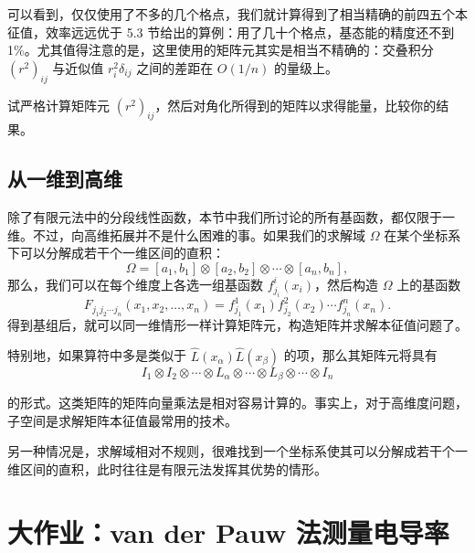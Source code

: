 可以看到，仅仅使用了不多的几个格点，我们就计算得到了相当精确的前四五个本征值，效率远远优于 5.3 节给出的算例：用了几十个格点，基态能的精度还不到 1\%。尤其值得注意的是，这里使用的矩阵元其实是相当不精确的：交叠积分 $(r^2)_{ij}$ 与近似值 $r_i^2\delta_{ij}$ 之间的差距在 $O(1/n)$ 的量级上。

\begin{exerciseBox}[练习 5.3]
试严格计算矩阵元 $(r^2)_{ij}$，然后对角化所得到的矩阵以求得能量，比较你的结果。
\end{exerciseBox}

\subsection{从一维到高维}

除了有限元法中的分段线性函数，本节中我们所讨论的所有基函数，都仅限于一维。不过，向高维拓展并不是什么困难的事。如果我们的求解域 $\Omega$ 在某个坐标系下可以分解成若干个一维区间的直积：
\begin{equation}
\Omega=[a_1,b_1]\otimes[a_2,b_2]\otimes\cdots\otimes[a_n,b_n],
\tag{5.4.53}
\end{equation}
那么，我们可以在每个维度上各选一组基函数 $f_{j_i}^{i}(x_i)$，然后构造 $\Omega$ 上的基函数
\begin{equation}
F_{j_1j_2\cdots j_n}(x_1,x_2,\ldots,x_n)=f_{j_1}^{1}(x_1)f_{j_2}^{2}(x_2)\cdots f_{j_n}^{n}(x_n).
\tag{5.4.54}
\end{equation}
得到基组后，就可以同一维情形一样计算矩阵元，构造矩阵并求解本征值问题了。

特别地，如果算符中多是类似于 $\hat L(x_\alpha)\hat L(x_\beta)$ 的项，那么其矩阵元将具有
\begin{equation}
I_1\otimes I_2\otimes\cdots\otimes L_\alpha\otimes\cdots\otimes L_\beta\otimes\cdots\otimes I_n
\tag{5.4.55}
\end{equation}

的形式。这类矩阵的矩阵向量乘法是相对容易计算的。事实上，对于高维度问题，子空间是求解矩阵本征值最常用的技术。

另一种情况是，求解域相对不规则，很难找到一个坐标系使其可以分解成若干个一维区间的直积，此时往往是有限元法发挥其优势的情形。

\section*{大作业：van der Pauw 法测量电导率}

